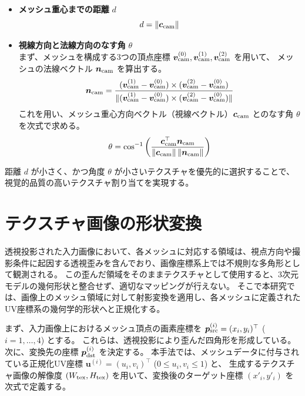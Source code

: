 \begin{itemize}
  \item \textbf{メッシュ重心までの距離} $d$
  \begin{equation}
    d = \|\bm{c}_{\rm cam}\|
  \end{equation}

  \item \textbf{視線方向と法線方向のなす角} $\theta$ \\
  まず、メッシュを構成する3つの頂点座標 $\bm{v}_{\rm cam}^{(0)}, \bm{v}_{\rm cam}^{(1)}, \bm{v}_{\rm cam}^{(2)}$ を用いて、
  メッシュの法線ベクトル $\bm{n}_{\rm cam}$ を算出する。
  \begin{equation}
    \bm{n}_{\rm cam} = \frac{(\bm{v}_{\rm cam}^{(1)} - \bm{v}_{\rm cam}^{(0)}) \times (\bm{v}_{\rm cam}^{(2)} - \bm{v}_{\rm cam}^{(0)})}
    {\|(\bm{v}_{\rm cam}^{(1)} - \bm{v}_{\rm cam}^{(0)}) \times (\bm{v}_{\rm cam}^{(2)} - \bm{v}_{\rm cam}^{(0)})\|}
  \end{equation}
  これを用い、メッシュ重心方向ベクトル（視線ベクトル）$\bm{c}_{\rm cam}$ とのなす角 $\theta$ を次式で求める。
  \begin{equation}
    \theta = \cos^{-1} \left( \frac{\bm{c}_{\rm cam}^\top \bm{n}_{\rm cam}}{\|\bm{c}_{\rm cam}\| \, \|\bm{n}_{\rm cam}\|} \right)
  \end{equation}
\end{itemize}

距離 $d$ が小さく、かつ角度 $\theta$ が小さいテクスチャを優先的に選択することで、
視覚的品質の高いテクスチャ割り当てを実現する。


\section{テクスチャ画像の形状変換}

透視投影された入力画像において、各メッシュに対応する領域は、視点方向や撮影条件に起因する透視歪みを含んでおり、画像座標系上では不規則な多角形として観測される。
この歪んだ領域をそのままテクスチャとして使用すると、3次元モデルの幾何形状と整合せず、適切なマッピングが行えない。
そこで本研究では、画像上のメッシュ領域に対して射影変換を適用し、各メッシュに定義されたUV座標系の幾何学的形状へと正規化する。

まず、入力画像上におけるメッシュ頂点の画素座標を $\bm{p}_{\rm src}^{(i)} = (x_i, y_i)^\top$ ($i=1, \dots, 4$) とする。
これらは、透視投影により歪んだ四角形を形成している。
次に、変換先の座標 $\bm{p}_{\rm dst}^{(i)}$ を決定する。
本手法では、メッシュデータに付与されている正規化UV座標 $\bm{u}^{(i)} = (u_i, v_i)^\top$ ($0 \leq u_i, v_i \leq 1$) と、
生成するテクスチャ画像の解像度 $(W_{\rm tex}, H_{\rm tex})$ を用いて、変換後のターゲット座標 $(x'_i, y'_i)$ を次式で定義する。

